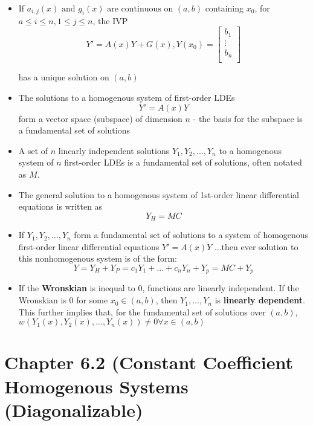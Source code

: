 \documentclass[10pt,letterpaper]{article}
\begin{document}
\begin{itemize}
\item If $a_{i,j}(x) \mbox{ and } g_i(x) \mbox{ are continuous on }(a,b)$ containing $x_0$, for $a\leq i \leq n, 1\leq j \leq n$, the IVP 
$$Y'=A(x)Y+G(x), Y(x_0)=\left[
\begin{array}{c}
b_1 \\ 
\vdots  \\ 
b_n \\ 
\end{array}
\right]
 $$
 
has a unique solution on $(a,b)$ 

\item The solutions to a homogenous system of first-order LDEs 
$$Y' = A(x)Y$$ form a vector space (subspace) of dimension $n$ - the basis for the subspace is a fundamental set of solutions 

\item A set of $n$ linearly independent solutions $Y_1, Y_2, ..., Y_n$ to a homogenous system of $n$ first-order LDEs is a fundamental set of solutions, often notated as $M$. %

\item The general solution to a homogenous system of 1st-order linear differential equations is written as 
$$Y_H=MC$$ 

\item If $Y_1, Y_2, ..., Y_n$ form a fundamental set of solutions to a system of homogenous first-order linear differential equations 
$Y'=A(x)Y$
...then ever solution to this nonhomogenous system is of the form: 
$$Y = Y_H + Y_P = c_1Y_1 +...+ c_nY_n+Y_p=MC+Y_p$$

\item If the \textbf{Wronskian} is inequal to 0, functions are linearly independent. If the Wronskian is 0 for some $x_0\in (a,b)$, then $Y_1, ... , Y_n$ is \textbf{linearly dependent}. \\ 
This further implies that, for the fundamental set of solutions over $(a,b)$, $w(Y_1(x), Y_2(x),...,Y_n(x))\neq 0 \forall x\in (a,b)$
\end{itemize}

\section*{Chapter 6.2 (Constant Coefficient Homogenous Systems  (Diagonalizable)}
\end{document}
